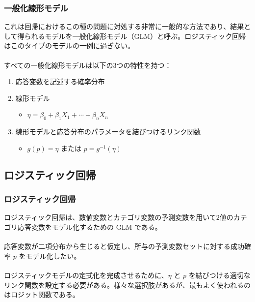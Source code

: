 \begin{frame}
\frametitle{一般化線形モデル}

これは回帰におけるこの種の問題に対処する非常に一般的な方法であり、結果として得られるモデルを一般化線形モデル（GLM）と呼ぶ。ロジスティック回帰はこのタイプのモデルの一例に過ぎない。\\
~\\
すべての一般化線形モデルは以下の3つの特性を持つ：
\begin{enumerate}
\item 応答変数を記述する確率分布
\item 線形モデル
\begin{itemize}
\item $\eta = \beta_0+\beta_1 X_1 + \cdots + \beta_n X_n$
\end{itemize}
\item 線形モデルと応答分布のパラメータを結びつけるリンク関数
\begin{itemize}
\item $g(p) = \eta$ または $p = g^{-1}(\eta)$
\end{itemize}
\end{enumerate}

\end{frame}


\subsection{ロジスティック回帰}


\begin{frame}
\frametitle{ロジスティック回帰}

ロジスティック回帰は、数値変数とカテゴリ変数の予測変数を用いて2値のカテゴリ応答変数をモデル化するための GLM である。\\
~\\
応答変数が二項分布から生じると仮定し、所与の予測変数セットに対する成功確率 $p$ をモデル化したい。\\
~\\

ロジスティックモデルの定式化を完成させるために、$\eta$ と $p$ を結びつける適切なリンク関数を設定する必要がある。様々な選択肢があるが、最もよく使われるのはロジット関数である。\\

~\\


\end{frame}

